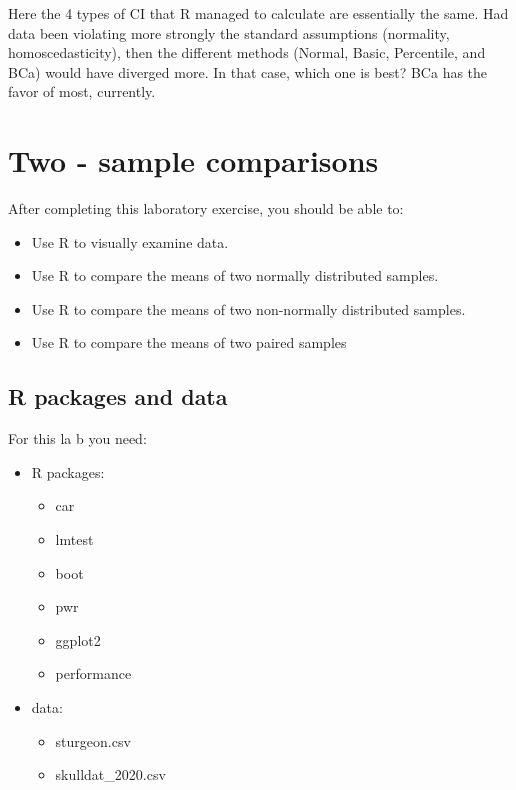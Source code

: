 \documentclass[
  12pt,
]{book}
\providecommand{\tightlist}{%
  \setlength{\itemsep}{0pt}\setlength{\parskip}{0pt}}
\begin{document}
Here the 4 types of CI that R managed to calculate are essentially the same. Had data been violating more strongly the standard assumptions (normality, homoscedasticity), then the different methods (Normal, Basic, Percentile, and BCa) would have diverged more. In that case, which one is best? BCa has the favor of most, currently.

\hypertarget{two---sample-comparisons}{%
\chapter{Two - sample comparisons}\label{two---sample-comparisons}}

After completing this laboratory exercise, you should be able to:

\begin{itemize}
\tightlist
\item
  Use R to visually examine data.
\item
  Use R to compare the means of two normally distributed samples.
\item
  Use R to compare the means of two non-normally distributed
  samples.
\item
  Use R to compare the means of two paired samples
\end{itemize}

\hypertarget{set-ttest}{%
\section{R packages and data}\label{set-ttest}}

For this la b you need:

\begin{itemize}
\tightlist
\item
  R packages:

  \begin{itemize}
  \tightlist
  \item
    car
  \item
    lmtest
  \item
    boot
  \item
    pwr
  \item
    ggplot2
  \item
    performance
  \end{itemize}
\item
  data:

  \begin{itemize}
  \tightlist
  \item
    sturgeon.csv
  \item
    skulldat\_2020.csv
  \end{itemize}
\end{itemize}
\end{document}

